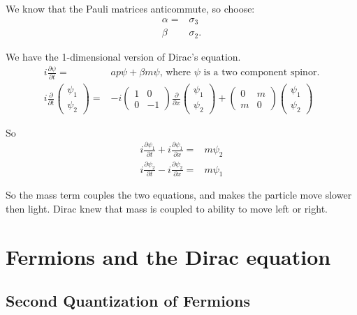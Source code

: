 \documentclass[]{article}
\begin{document}
We know that the Pauli matrices anticommute, so choose:
\begin{align*}
	\alpha =& \sigma_3\\
	\beta& \sigma_2.
\end{align*}

We have the 1-dimensional version of Dirac's equation.
\begin{align*}
	i \frac{\partial \psi}{\partial t}=& a p \psi + \beta m \psi \text{, where $\psi$ is a two component spinor.}\\
	i \frac{\partial}{\partial t}\begin{pmatrix}
	\psi_1\\
	\psi_2
	\end{pmatrix}=&-i \begin{pmatrix}
	1&0\\
	0&-1
	\end{pmatrix} \frac{\partial}{\partial x}\begin{pmatrix}
	\psi_1\\
	\psi_2
	\end{pmatrix} + \begin{pmatrix}
	0&m\\
	m&0
	\end{pmatrix}\begin{pmatrix}
	\psi_1\\
	\psi_2
	\end{pmatrix}
\end{align*}

So
\begin{align*}
	i\frac{\partial \psi_1}{\partial t} + i\frac{\partial \psi_1}{\partial x}=&m \psi_2\\
	i\frac{\partial \psi_2}{\partial t} - i\frac{\partial \psi_2}{\partial x}=&m \psi_1
\end{align*}

So the mass term couples the two equations, and makes the particle move slower then light. Dirac knew that mass is coupled to ability to move left or right.

\section{Fermions and the Dirac equation}\label{section:fermions:dirac}

\subsection{Second Quantization of Fermions}
\end{document}

